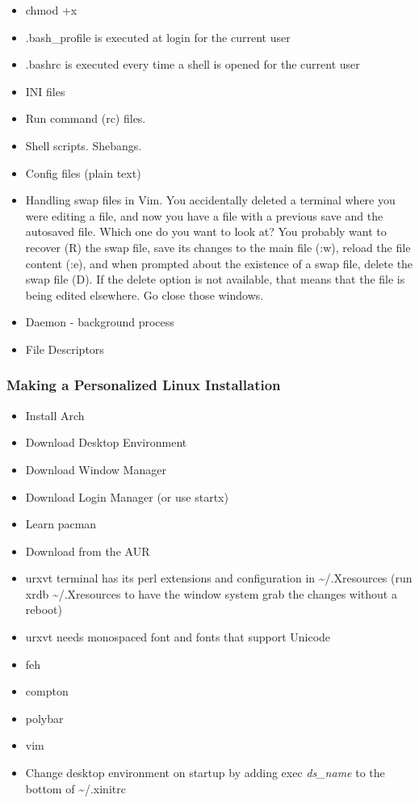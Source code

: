 \begin{itemize}
	\item chmod +x
	\item .bash\_profile is executed at login for the current user
	\item .bashrc is executed every time a shell is opened for the current user
	\item INI files
	\item Run command (rc) files.
	\item Shell scripts. Shebangs.
	\item Config files (plain text)
	\item Handling swap files in Vim. You accidentally deleted a terminal where you were editing a file, and now you have a file with a previous save and the autosaved file. Which one do you want to look at? You probably want to recover (R) the swap file, save its changes to the main file (:w), reload the file content (:e), and when prompted about the existence of a swap file, delete the swap file (D). If the delete option is not available, that means that the file is being edited elsewhere. Go close those windows.
	\item Daemon - background process
	\item File Descriptors
\end{itemize}

\subsubsection{Making a Personalized Linux Installation}

\begin{itemize}
	\item Install Arch
	\item Download Desktop Environment
	\item Download Window Manager
	\item Download Login Manager (or use startx)
	\item Learn pacman
	\item Download from the AUR
	\item urxvt terminal has its perl extensions and configuration in \textasciitilde/.Xresources (run xrdb \textasciitilde/.Xresources to have the window system grab the changes without a reboot)
	\item urxvt needs monospaced font and fonts that support Unicode
	\item feh
	\item compton
	\item polybar
	\item vim
	\item Change desktop environment on startup by adding exec \textit{ds\_name} to the bottom of \textasciitilde/.xinitrc
\end{itemize}

